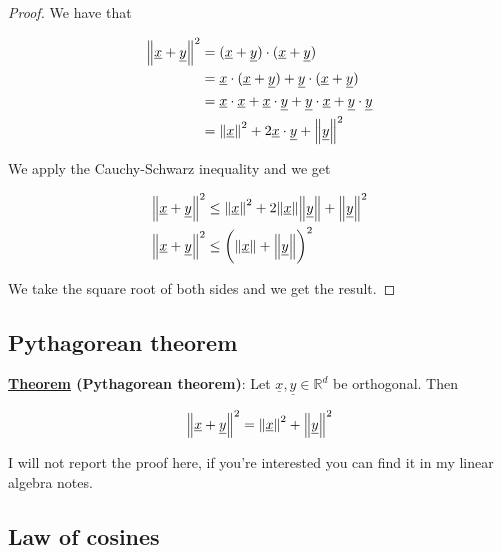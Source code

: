 \documentclass[10pt]{extarticle}
\newcommand{\R}{\mathbb{R}}
\begin{document}
\begin{proof}
    We have that

    \begin{align*}
        \norm{\underline{x} + \underline{y}}^2 & = (\underline{x} + \underline{y}) \cdot (\underline{x} + \underline{y})                                                                         \\
                                               & = \underline{x} \cdot (\underline{x} + \underline{y}) + \underline{y} \cdot (\underline{x} + \underline{y})                                     \\
                                               & = \underline{x} \cdot \underline{x} + \underline{x} \cdot \underline{y} + \underline{y} \cdot \underline{x} + \underline{y} \cdot \underline{y} \\
                                               & = \norm{\underline{x}}^2 + 2 \underline{x} \cdot \underline{y} + \norm{\underline{y}}^2
    \end{align*}

    We apply the Cauchy-Schwarz inequality and we get

    \begin{align*}
        \norm{\underline{x} + \underline{y}}^2 & \leq \norm{\underline{x}}^2 + 2 \norm{\underline{x}} \norm{\underline{y}} + \norm{\underline{y}}^2 \\
        \norm{\underline{x} + \underline{y}}^2 & \leq \left(\norm{\underline{x}} + \norm{\underline{y}}\right)^2
    \end{align*}

    We take the square root of both sides and we get the result.
\end{proof}

\subsection{Pythagorean theorem}

\textbf{\underline{Theorem} (Pythagorean theorem)}: Let $\underline{x}, \underline{y} \in \R^d$ be orthogonal. Then

$$
    \norm{\underline{x} + \underline{y}}^2 = \norm{\underline{x}}^2 + \norm{\underline{y}}^2
$$

I will not report the proof here, if you're interested you can find it in my linear algebra notes.

\subsection{Law of cosines}
\end{document}
